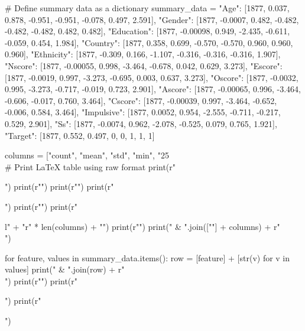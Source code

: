\documentclass{article}
\begin{document}
\begin{pycode}
# Define summary data as a dictionary
summary_data = {
    "Age":         [1877, 0.037, 0.878, -0.951, -0.951, -0.078, 0.497, 2.591],
    "Gender":      [1877, -0.0007, 0.482, -0.482, -0.482, -0.482, 0.482, 0.482],
    "Education":   [1877, -0.00098, 0.949, -2.435, -0.611, -0.059, 0.454, 1.984],
    "Country":     [1877, 0.358, 0.699, -0.570, -0.570, 0.960, 0.960, 0.960],
    "Ethnicity":   [1877, -0.309, 0.166, -1.107, -0.316, -0.316, -0.316, 1.907],
    "Nscore":      [1877, -0.00055, 0.998, -3.464, -0.678, 0.042, 0.629, 3.273],
    "Escore":      [1877, -0.0019, 0.997, -3.273, -0.695, 0.003, 0.637, 3.273],
    "Oscore":      [1877, -0.0032, 0.995, -3.273, -0.717, -0.019, 0.723, 2.901],
    "Ascore":      [1877, -0.00065, 0.996, -3.464, -0.606, -0.017, 0.760, 3.464],
    "Cscore":      [1877, -0.00039, 0.997, -3.464, -0.652, -0.006, 0.584, 3.464],
    "Impulsive":   [1877, 0.0052, 0.954, -2.555, -0.711, -0.217, 0.529, 2.901],
    "Ss":          [1877, -0.0074, 0.962, -2.078, -0.525, 0.079, 0.765, 1.921],
    "Target":      [1877, 0.552, 0.497, 0, 0, 1, 1, 1]
    }

columns = ["count", "mean", "std", "min", "25\\%

# Print LaTeX table using raw format
print(r"\begin{table}[h!]")
print(r"\centering")
print(r"\small")
print(r"\caption{Summary statistics of features and target variable}")
print(r"\label{tab:summary_statistics}")
print(r"\begin{tabular}{l" + "r" * len(columns) + "}")
print(r"\toprule")
print(" & ".join([""] + columns) + r" \\ \midrule")

for feature, values in summary_data.items():
    row = [feature] + [str(v) for v in values]
    print(" & ".join(row) + r" \\")
print(r"\bottomrule")
print(r"\end{tabular}")
print(r"\end{table}")
\end{pycode}
\end{document}
